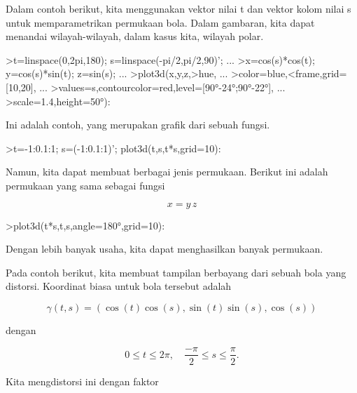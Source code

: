\documentclass{article}
\begin{document}
\begin{eulernotebook}
\begin{eulercomment}
Dalam contoh berikut, kita menggunakan vektor nilai t dan vektor kolom
nilai s untuk memparametrikan permukaan bola. Dalam gambaran, kita
dapat menandai wilayah-wilayah, dalam kasus kita, wilayah polar.
\end{eulercomment}
\begin{eulerprompt}
>t=linspace(0,2pi,180); s=linspace(-pi/2,pi/2,90)'; ...
>x=cos(s)*cos(t); y=cos(s)*sin(t); z=sin(s); ...
>plot3d(x,y,z,>hue, ...
>color=blue,<frame,grid=[10,20], ...
>values=s,contourcolor=red,level=[90°-24°;90°-22°], ...
>scale=1.4,height=50°):
\end{eulerprompt}
\begin{eulercomment}
Ini adalah contoh, yang merupakan grafik dari sebuah fungsi.
\end{eulercomment}
\begin{eulerprompt}
>t=-1:0.1:1; s=(-1:0.1:1)'; plot3d(t,s,t*s,grid=10):
\end{eulerprompt}
\begin{eulercomment}
Namun, kita dapat membuat berbagai jenis permukaan. Berikut ini adalah
permukaan yang sama sebagai fungsi

\end{eulercomment}
\begin{eulerformula}
\[
x = y \, z
\]
\end{eulerformula}
\begin{eulerprompt}
>plot3d(t*s,t,s,angle=180°,grid=10):
\end{eulerprompt}
\begin{eulercomment}
Dengan lebih banyak usaha, kita dapat menghasilkan banyak permukaan.

Pada contoh berikut, kita membuat tampilan berbayang dari sebuah bola
yang distorsi. Koordinat biasa untuk bola tersebut adalah

\end{eulercomment}
\begin{eulerformula}
\[
\gamma(t,s) = (\cos(t)\cos(s),\sin(t)\sin(s),\cos(s))
\]
\end{eulerformula}
\begin{eulercomment}
dengan

\end{eulercomment}
\begin{eulerformula}
\[
0 \le t \le 2\pi, \quad \frac{-\pi}{2} \le s \le \frac{\pi}{2}.
\]
\end{eulerformula}
\begin{eulercomment}
Kita mengdistorsi ini dengan faktor


\end{eulercomment}
\end{eulernotebook}
\end{document}
